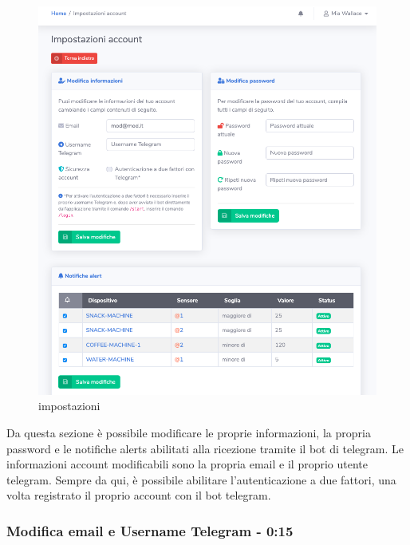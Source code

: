 	\begin{figure}[H]
		\centering
		\includegraphics[scale=0.600]{res/images/membro/impostazioni.png}
		\caption{impostazioni}
	\end{figure}

	Da questa sezione è possibile modificare le proprie informazioni, la propria password e le notifiche alerts abilitati alla ricezione tramite il bot di telegram.
	Le informazioni account modificabili sono la propria email e il proprio utente telegram. Sempre da qui, è possibile abilitare l’autenticazione a due fattori, una volta registrato il proprio account con il bot telegram.


	\subsubsection{Modifica email e Username Telegram - 0:15}

